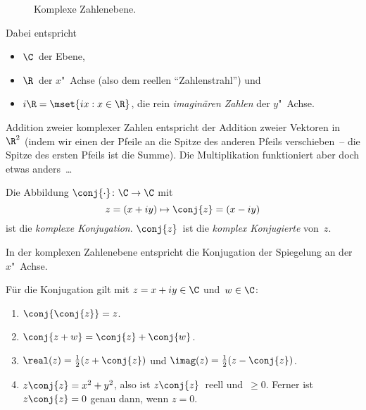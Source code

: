\documentclass[a4paper]{article}
\begin{document}
\begin{figure}
    \caption{Komplexe Zahlenebene.}
\end{figure}

Dabei entspricht
\begin{itemize}
    \item $\C$~der Ebene,
    \item $\R$~der $x$"~Achse (also dem reellen "`Zahlenstrahl"') und
    \item $i\R = \mset{ix : x \in \R}$, die rein \emph{imaginären Zahlen} der $y$"~Achse.
\end{itemize}
Addition zweier komplexer Zahlen entspricht der Addition zweier Vektoren in~$\R^2$ (indem wir einen der Pfeile an die Spitze des anderen Pfeils verschieben~-- die Spitze des ersten Pfeils ist die Summe). Die Multiplikation funktioniert aber doch etwas anders~\dots

\begin{definition}
    Die Abbildung $\conj{\cdot}\colon \C \to \C$ mit
    \begin{equation*}
        z = (x+iy) \mapsto \conj{z} = (x-iy)
    \end{equation*}
    ist die \emph{komplexe Konjugation}. $\conj{z}$~ist die \emph{komplex Konjugierte} von~$z$.
\end{definition}

In der komplexen Zahlenebene entspricht die Konjugation der Spiegelung an der $x$"~Achse.

\begin{lemma}
    Für die Konjugation gilt mit $z = x+iy \in \C$ und~$w \in \C$:
    \begin{enumerate}
        \item $\conj{\conj{z}} = z$.
        \item $\conj{z+w} = \conj{z}+\conj{w}$.
        \item $\real(z) = \frac{1}{2}(z+\conj{z})$ und $\imag(z) = \frac{1}{2}(z-\conj{z})$.
        \item $z\conj{z} = x^2+y^2$, also ist $z\conj{z}$~reell und~$\geq 0$. Ferner ist $z\conj{z} = 0$ genau dann, wenn $z = 0$.
    \end{enumerate}
\end{lemma}
\end{document}

